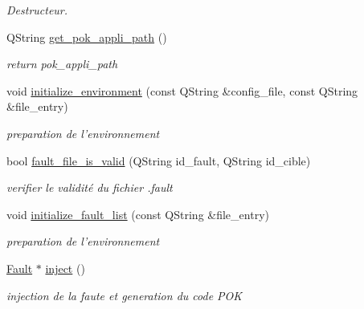 \begin{DoxyCompactItemize}
\begin{DoxyCompactList}\small\item\em Destructeur. \item\end{DoxyCompactList}\item 
QString \hyperlink{classInjector_a5e00ba8b08dc5fbd87e4607a2687655f}{get\_\-pok\_\-appli\_\-path} ()
\begin{DoxyCompactList}\small\item\em return pok\_\-appli\_\-path \item\end{DoxyCompactList}\item 
void \hyperlink{classInjector_a097acccd64ff95a0763d99c51a7ab2e7}{initialize\_\-environment} (const QString \&config\_\-file, const QString \&file\_\-entry)
\begin{DoxyCompactList}\small\item\em preparation de l'environnement \item\end{DoxyCompactList}\item 
bool \hyperlink{classInjector_a2dab7e4a6ff7daef39596f64ad76ee5e}{fault\_\-file\_\-is\_\-valid} (QString id\_\-fault, QString id\_\-cible)
\begin{DoxyCompactList}\small\item\em verifier le validité du fichier .fault \item\end{DoxyCompactList}\item 
void \hyperlink{classInjector_ae4a9416054f13e1a5c84c475ae4670d2}{initialize\_\-fault\_\-list} (const QString \&file\_\-entry)
\begin{DoxyCompactList}\small\item\em preparation de l'environnement \item\end{DoxyCompactList}\item 
\hyperlink{classFault}{Fault} $\ast$ \hyperlink{classInjector_ae60e299c7e4e5cfc2537ddb0a8a56358}{inject} ()
\begin{DoxyCompactList}\small\item\em injection de la faute et generation du code POK \item\end{DoxyCompactList}\end{DoxyCompactItemize}


